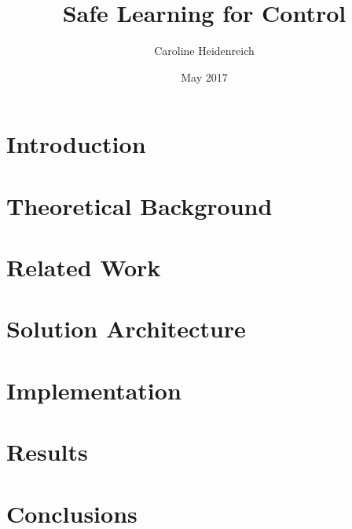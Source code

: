\documentclass[a4paper,11pt]{kth-mag}
\title{Safe Learning for Control}
\author{Caroline Heidenreich}
\date{May 2017}
\begin{document}
\setlength{\parindent}{0pt}
\setlength{\parskip}{0.5em}
\maketitle

\chapter{Introduction}\label{sec:Introduction}


\chapter{Theoretical Background}



\chapter{Related Work}


\chapter{Solution Architecture}\label{sec:SolutionArchitecture}


\chapter{Implementation}\label{sec:Implementation}


\chapter{Results}


\chapter{Conclusions}





\end{document}

